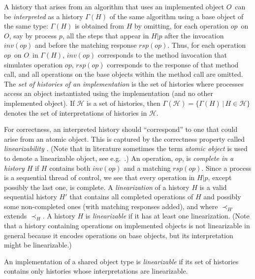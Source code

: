 \documentclass[11pt,letterpaper]{article}
\newcommand{\HH}{\mathcal{H}}
\newcommand{\obj}{\ensuremath{\mathit{O}}}
\newcommand{\op}{\ensuremath{\mathit{op}}}
\newcommand{\inv}[1]{\ensuremath{inv(#1)}}
\newcommand{\rsp}[1]{\ensuremath{rsp(#1)}}
\begin{document}
A  history that arises from an algorithm that uses an implemented object \obj\
can be \emph{interpreted} as a history $\Gamma(H)$ of the same algorithm using a base object of the same type:
$\Gamma(H)$ is obtained from $H$ by omitting, for each operation \op\ on \obj, say by process $p$,
  all the steps that appear in $H|p$ after the invocation $\inv{\op}$ and before the matching response $\rsp{op}$.
Thus, for each operation \op\ on \obj\ in $\Gamma(H)$,
\inv{\op} corresponds to the method invocation that simulates operation \op,
\rsp{\op} corresponds to the response of that method call, and
all operations on the base objects within the method call are omitted.
The \emph{set of histories of an implementation} is the set of histories where processes access an object instantiated using the implementation (and no other implemented object).
If $\HH$ is a set of histories, then $\Gamma(\HH)=\{\Gamma(H)\,|\,H\in\HH\}$ denotes the set of interpretations of histories in $\HH$.

For correctness, an interpreted history should ``correspond'' to one that could arise from an atomic object.
This is captured by the correctness property called \emph{linearizability} \cite{her:lin}.
(Note that in literature sometimes the term \emph{atomic object} is used to denote a linearizable object, see e.g.\ \cite{Lynch_DistributedAlgorithms1996}.)
An operation, \op, is \emph{complete in a history $H$} if $H$ contains both \inv{\op} and a matching \rsp{\op}.
Since a process is a sequential thread of control,
we see that every operation in $H|p$, except possibly the last one, is complete.
A \emph{linearization} of a history $H$ is a valid sequential history $H'$
that contains all completed operations of $H$ and possibly some non-completed ones (with matching responses added),
and where $\prec_{H'}$ extends $\prec_H$.
A history $H$ is \emph{linearizable} if it has at least one linearization.
(Note that a history containing operations on implemented objects is not linearizable in general because it encodes operations
  on base objects, but its interpretation might be linearizable.)

An implementation of a shared object type is \emph{linearizable} if its set of histories
contains only histories whose interpretations are linearizable.
\end{document}
